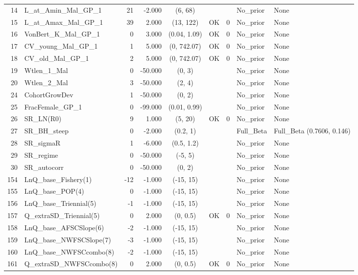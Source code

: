 \documentclass[12pt,]{article}
\begin{document}
\begin{landscape}
\begin{longtable}{rlrrcccll}
  14 & L\_at\_Amin\_Mal\_GP\_1 & 21 & -2.000 & (6, 68) &  &  & No\_prior & None \\ 
  15 & L\_at\_Amax\_Mal\_GP\_1 & 39 & 2.000 & (13, 122) & OK & 0 & No\_prior & None \\ 
  16 & VonBert\_K\_Mal\_GP\_1 & 0 & 3.000 & (0.04, 1.09) & OK & 0 & No\_prior & None \\ 
  17 & CV\_young\_Mal\_GP\_1 & 1 & 5.000 & (0, 742.07) & OK & 0 & No\_prior & None \\ 
  18 & CV\_old\_Mal\_GP\_1 & 2 & 5.000 & (0, 742.07) & OK & 0 & No\_prior & None \\ 
  19 & Wtlen\_1\_Mal & 0 & -50.000 & (0, 3) &  &  & No\_prior & None \\ 
  20 & Wtlen\_2\_Mal & 3 & -50.000 & (2, 4) &  &  & No\_prior & None \\ 
  24 & CohortGrowDev & 1 & -50.000 & (0, 2) &  &  & No\_prior & None \\ 
  25 & FracFemale\_GP\_1 & 0 & -99.000 & (0.01, 0.99) &  &  & No\_prior & None \\ 
  26 & SR\_LN(R0) & 9 & 1.000 & (5, 20) & OK & 0 & No\_prior & None \\ 
  27 & SR\_BH\_steep & 0 & -2.000 & (0.2, 1) &  &  & Full\_Beta & Full\_Beta (0.7606, 0.146) \\ 
  28 & SR\_sigmaR & 1 & -6.000 & (0.5, 1.2) &  &  & No\_prior & None \\ 
  29 & SR\_regime & 0 & -50.000 & (-5, 5) &  &  & No\_prior & None \\ 
  30 & SR\_autocorr & 0 & -50.000 & (0, 2) &  &  & No\_prior & None \\ 
  154 & LnQ\_base\_Fishery(1) & -12 & -1.000 & (-15, 15) &  &  & No\_prior & None \\ 
  155 & LnQ\_base\_POP(4) & 0 & -1.000 & (-15, 15) &  &  & No\_prior & None \\ 
  156 & LnQ\_base\_Triennial(5) & -1 & -1.000 & (-15, 15) &  &  & No\_prior & None \\ 
  157 & Q\_extraSD\_Triennial(5) & 0 & 2.000 & (0, 0.5) & OK & 0 & No\_prior & None \\ 
  158 & LnQ\_base\_AFSCSlope(6) & -2 & -1.000 & (-15, 15) &  &  & No\_prior & None \\ 
  159 & LnQ\_base\_NWFSCSlope(7) & -3 & -1.000 & (-15, 15) &  &  & No\_prior & None \\ 
  160 & LnQ\_base\_NWFSCcombo(8) & -2 & -1.000 & (-15, 15) &  &  & No\_prior & None \\ 
  161 & Q\_extraSD\_NWFSCcombo(8) & 0 & 2.000 & (0, 0.5) & OK & 0 & No\_prior & None \\ 

\end{longtable}
\end{landscape}
\end{document}
